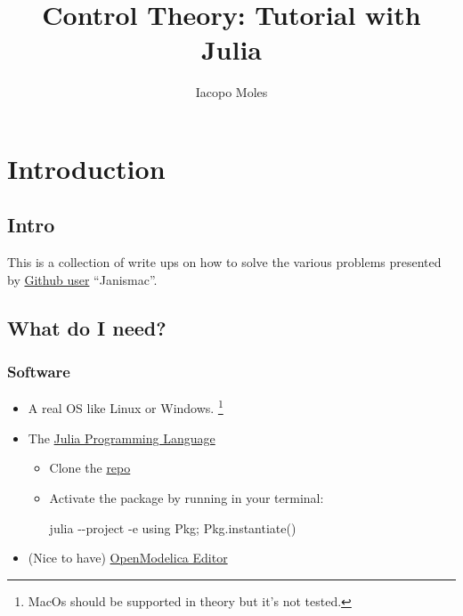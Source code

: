 \documentclass[
  8pt,
  a4paper,
]{book}
\title{Control Theory: Tutorial with Julia}
\author{Iacopo Moles}
\date{}
\newenvironment{Shaded}{\begin{snugshade}}{\end{snugshade}}
\newcommand{\AttributeTok}[1]{\textcolor[rgb]{0.40,0.45,0.13}{#1}}
\newcommand{\ExtensionTok}[1]{\textcolor[rgb]{0.00,0.23,0.31}{#1}}
\newcommand{\StringTok}[1]{\textcolor[rgb]{0.13,0.47,0.30}{#1}}
\renewcommand*\contentsname{Table of contents}
\newcommand\contentsname{Table of contents}
\begin{document}
\frontmatter
\maketitle


\renewcommand*\contentsname{Table of contents}
{
\setcounter{tocdepth}{2}
\tableofcontents
}

\mainmatter
{}

\chapter{Introduction}\label{introduction}

\section{Intro}\label{sec-home}

This is a collection of write ups on how to solve the various problems
presented by \href{https://janismac.github.io/ControlChallenges/}{Github
user} ``Janismac''.

\section{What do I need?}\label{what-do-i-need}

\subsection{Software}\label{software}

\begin{itemize}
\item
  A real OS like Linux or Windows. \footnote{MacOs should be supported
    in theory but it's not tested.}
\item
  The \href{https://julialang.org/install/}{Julia Programming Language}

  \begin{itemize}
  \item
    Clone the
    \href{https://github.com/icpmoles/controlchallengessolutions}{repo}
  \item
    Activate the package by running in your terminal:

\begin{Shaded}
\begin{Highlighting}[]
\ExtensionTok{julia} \AttributeTok{{-}{-}project} \AttributeTok{{-}e} \StringTok{\textquotesingle{}using Pkg; Pkg.instantiate()\textquotesingle{}}
\end{Highlighting}
\end{Shaded}
  \end{itemize}
\item
  (Nice to have) \href{https://openmodelica.org/}{OpenModelica Editor}
\end{itemize}
\end{document}
